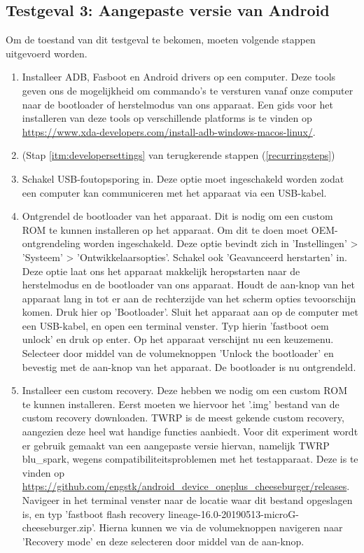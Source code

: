 \subsection{Testgeval 3: Aangepaste versie van Android}

Om de toestand van dit testgeval te bekomen, moeten volgende stappen uitgevoerd worden.

\begin{enumerate}
    \item Installeer ADB, Fasboot en Android drivers op een computer. Deze tools geven ons de mogelijkheid om commando's te versturen vanaf onze computer naar de bootloader of herstelmodus van ons apparaat. Een gids voor het installeren van deze tools op verschillende platforms is te vinden op \url{https://www.xda-developers.com/install-adb-windows-macos-linux/}.
    
    \item 
     (Stap \ref{itm:developersettings} van terugkerende stappen (\ref{recurringsteps})
    
    \item Schakel USB-foutopsporing in. Deze optie moet ingeschakeld worden zodat een computer kan communiceren met het apparaat via een USB-kabel.
    
    \item Ontgrendel de bootloader van het apparaat. Dit is nodig om een custom ROM te kunnen installeren op het apparaat. Om dit te doen moet OEM-ontgrendeling worden ingeschakeld. Deze optie bevindt zich in 'Instellingen' > 'Systeem' > 'Ontwikkelaarsopties'. Schakel ook 'Geavanceerd herstarten' in. Deze optie laat ons het apparaat makkelijk heropstarten naar de herstelmodus en de bootloader van ons apparaat. Houdt de aan-knop van het apparaat lang in tot er aan de rechterzijde van het scherm opties tevoorschijn komen. Druk hier op 'Bootloader'. Sluit het apparaat aan op de computer met een USB-kabel, en open een terminal venster. Typ hierin 'fastboot oem unlock' en druk op enter. Op het apparaat verschijnt nu een keuzemenu. Selecteer door middel van de volumeknoppen 'Unlock the bootloader' en bevestig met de aan-knop van het apparaat. De bootloader is nu ontgrendeld.
    
    \item 
    Installeer een custom recovery. Deze hebben we nodig om een custom ROM te kunnen installeren. Eerst moeten we hiervoor het '.img' bestand van de custom recovery downloaden. TWRP is de meest gekende custom recovery, aangezien deze heel wat handige functies aanbiedt. Voor dit experiment wordt er gebruik gemaakt van een aangepaste versie hiervan, namelijk TWRP blu\_spark, wegens compatibiliteitsproblemen met het testapparaat. Deze is te vinden op \url{https://github.com/engstk/android_device_oneplus_cheeseburger/releases}. Navigeer in het terminal venster naar de locatie waar dit bestand opgeslagen is, en typ 'fastboot flash recovery lineage-16.0-20190513-microG-cheeseburger.zip'. Hierna kunnen we via de volumeknoppen navigeren naar 'Recovery mode' en deze selecteren door middel van de aan-knop.
    

\end{enumerate}
